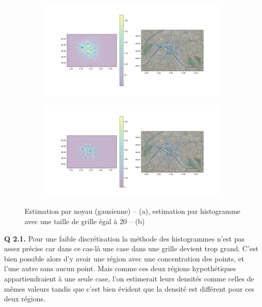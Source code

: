 \documentclass[a4paper,11pt]{article}
\theoremstyle{plain}
\theoremstyle{definition}
\begin{document}
\begin{figure}[ht]
    \centering
    \begin{subfigure}{1.0\textwidth}
    	\centering
    	\includegraphics{Figures/Figure_3.png}
    	\caption{}
    	\label{DensEstimKernelGauss}
    \end{subfigure}

    \begin{subfigure}{1.0\textwidth}
    	\centering
    	\includegraphics{Figures/Figure_4.png}
    	\caption{}
    	\label{DensEstimHist20}
    \end{subfigure}
    \caption{Estimation par noyau (gausienne) -- (a), estimation par histogramme avec une taille de grille égal à 20 -- (b)}
    \label{DensEstim}
\end{figure}

\textbf{Q 2.1.} Pour une faible discrétisation la méthode des histogrammes n'est pas assez précise car dans ce cas-là une case dans une grille devient trop grand. C'est bien possible alors d'y avoir une région avec une concentration des points, et l'une autre sans aucun point. Mais comme ces deux régions hypothétiques appartiendraient à une seule case, l'on estimerait leurs densités comme celles de mêmes valeurs tandis que c'est bien évident que la densité est différent pour ces deux régions.
\end{document}
